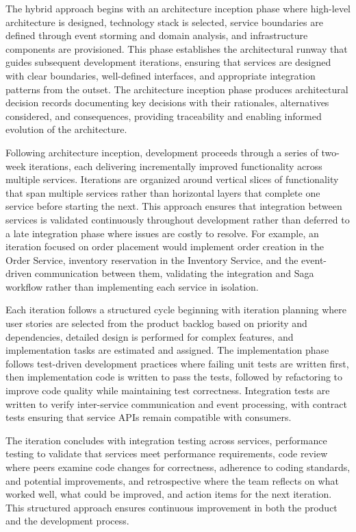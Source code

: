 The hybrid approach begins with an architecture inception phase where high-level architecture is designed, technology stack is selected, service boundaries are defined through event storming and domain analysis, and infrastructure components are provisioned. This phase establishes the architectural runway that guides subsequent development iterations, ensuring that services are designed with clear boundaries, well-defined interfaces, and appropriate integration patterns from the outset. The architecture inception phase produces architectural decision records documenting key decisions with their rationales, alternatives considered, and consequences, providing traceability and enabling informed evolution of the architecture.

Following architecture inception, development proceeds through a series of two-week iterations, each delivering incrementally improved functionality across multiple services. Iterations are organized around vertical slices of functionality that span multiple services rather than horizontal layers that complete one service before starting the next. This approach ensures that integration between services is validated continuously throughout development rather than deferred to a late integration phase where issues are costly to resolve. For example, an iteration focused on order placement would implement order creation in the Order Service, inventory reservation in the Inventory Service, and the event-driven communication between them, validating the integration and Saga workflow rather than implementing each service in isolation.

Each iteration follows a structured cycle beginning with iteration planning where user stories are selected from the product backlog based on priority and dependencies, detailed design is performed for complex features, and implementation tasks are estimated and assigned. The implementation phase follows test-driven development practices where failing unit tests are written first, then implementation code is written to pass the tests, followed by refactoring to improve code quality while maintaining test correctness. Integration tests are written to verify inter-service communication and event processing, with contract tests ensuring that service APIs remain compatible with consumers.

The iteration concludes with integration testing across services, performance testing to validate that services meet performance requirements, code review where peers examine code changes for correctness, adherence to coding standards, and potential improvements, and retrospective where the team reflects on what worked well, what could be improved, and action items for the next iteration. This structured approach ensures continuous improvement in both the product and the development process.


